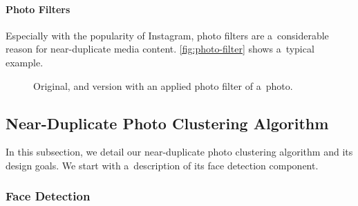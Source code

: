 \paragraph{Photo Filters}

Especially with the popularity of Instagram, photo filters
are a~considerable reason for near-duplicate media content.
\autoref{fig:photo-filter} shows a~typical example.

\begin{figure}[h!]
  \centering
  \caption{Original, and version with an applied photo filter of a~photo.}
  \label{fig:photo-filter}  
\end{figure}

\subsection{Near-Duplicate Photo Clustering Algorithm}
\label{sec:near-duplicate-clustering-algorithm}

In this subsection, we detail our near-duplicate photo clustering algorithm
and its design goals.
We start with a~description of its face detection component.

\subsubsection{Face Detection}
\label{sec:face-detection}


